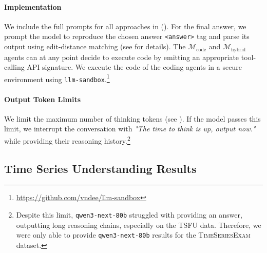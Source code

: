 \documentclass[11pt]{article}
\newcommand{\mcode}{$\mathcal{M}_{\text{code}}$}
\newcommand{\mhybrid}{$\mathcal{M}_{\text{hybrid}}$}
\begin{document}





\paragraph{Implementation} We include the full prompts for all approaches in  (). For the final answer, we prompt the model to reproduce the chosen answer \texttt{<answer>} tag and parse its output using edit-distance matching (see  for details). The \mcode{} and \mhybrid{} agents can at any point decide to execute code by emitting an appropriate tool-calling API signature. We execute the code of the coding agents in a secure environment using \texttt{llm-sandbox}.\footnote{\url{https://github.com/vndee/llm-sandbox}} 

\paragraph{Output Token Limits} We limit the maximum number of thinking tokens (see ). If the model passes this limit, we interrupt the conversation with \emph{"The time to think is up, output now."} while providing their reasoning history.\footnote{Despite this limit, \texttt{qwen3-next-80b} struggled with providing an answer, outputting long reasoning chains, especially on the \textsc{TSFU} data. Therefore, we were only able to provide \texttt{qwen3-next-80b} results for the \textsc{TimeSeriesExam} dataset.}



\subsection{Time Series Understanding Results}
\label{sec:time-series-understanding-results}
\begin{table}[t]
    \centering
    \small
    
    \vspace{-1em}
    \caption{Accuracies of agents on time series understanding benchmarks, compared to the random baseline (TSE = \textsc{TimeSeriesExam}).}
    \label{tab:results}
\end{table}
\end{document}
